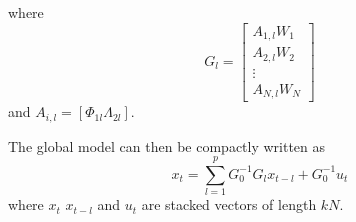 \documentclass[preprint, 12pt]{elsarticle}
\newcommand{\?}{\stackrel{?}{=}}
\begin{document}
where
\begin{equation}
  \label{eq:5}
  G_{l} =
  \begin{bmatrix}
    A_{1,l}W_{1}\\ A_{2,l}W_{2}\\ \vdots \\A_{N,l}W_{N}
  \end{bmatrix}
\end{equation}
and $A_{i,l} = [\Phi_{1l}  \Lambda_{2l}]$.

The global model can then be compactly written as
\begin{equation}
  \label{eq:6}
  x_{t} = \sum_{l=1}^{p}G_{0}^{-1}G_{l }x_{t-l} + G_{0}^{-1}u_{t}
\end{equation}
where $x_{t}$ $x_{t-l}$ and $u_{t}$ are stacked vectors of length $kN$.





\end{document}
